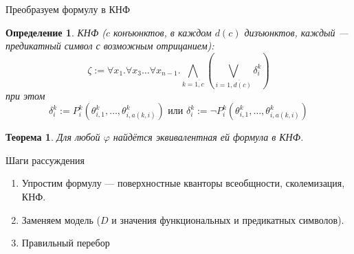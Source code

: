 \documentclass[aspectratio=169]{beamer}
\newtheorem{thm}{Теорема}[section]
\newtheorem{dfn}{Определение}[section]
\begin{document}
\begin{frame}{Преобразуем формулу в КНФ}

\begin{dfn}КНФ ($c$ конъюнктов, в каждом $d(c)$ дизъюнктов, каждый --- предикатный символ с возможным отрицанием):
$$\zeta := \forall x_1.\forall x_3\dots\forall x_{n-1}.
    \bigwedge_{k=\overline{1,c}}\left(\bigvee_{i = \overline{1,d(c)}}\delta^k_i\right)$$
при этом
$$\delta^k_i := P^k_i(\theta^k_{i,1},\dots,\theta^k_{i,a(k,i)})\text{ или }\delta^k_i := \neg P^k_i(\theta^k_{i,1},\dots,\theta^k_{i,a(k,i)})$$
\end{dfn}

\begin{thm} Для любой $\varphi$ найдётся эквивалентная ей формула в КНФ.\end{thm}

\end{frame}

\begin{frame}{Шаги рассуждения}
\begin{enumerate}
\item \color{gray}Упростим формулу --- поверхностные кванторы всеобщности, сколемизация, КНФ.
\item \color{black}Заменяем модель ($D$ и значения функциональных и предикатных символов).
\item \color{gray}Правильный перебор
\end{enumerate}
\end{frame}
\end{document}
